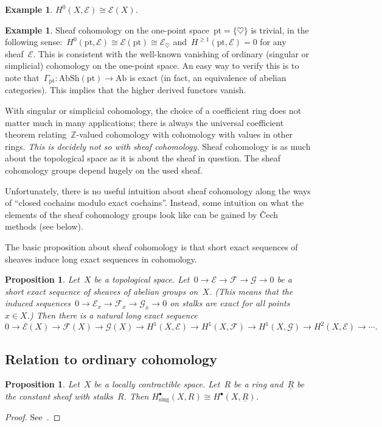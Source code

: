 \documentclass[10pt]{amsart}
\theoremstyle{definition}
\newtheorem{ex}[defn]{Example}
\theoremstyle{plain}
\newtheorem{prop}[defn]{Proposition}
\theoremstyle{remark}
\newcommand{\E}{\mathcal{E}}
\newcommand{\F}{\mathcal{F}}
\newcommand{\G}{\mathcal{G}}
\newcommand{\Z}{\mathbb{Z}}
\newcommand{\Ab}{\mathrm{Ab}}
\newcommand{\AbSh}{\mathrm{AbSh}}
\newcommand{\pt}{\mathrm{pt}}
\begin{document}
\begin{ex}$H^0(X,\E) \cong \E(X)$.\end{ex}

\begin{ex}Sheaf cohomology on the one-point space~$\pt = \{ \heartsuit \}$ is
trivial, in the following sense:~$H^0(\pt,\E) \cong \E(\pt) \cong \E_\heartsuit$
and~$H^{\geq 1}(\pt,\E) = 0$ for any sheaf~$\E$. This is consistent with the
well-known vanishing of ordinary (singular or simplicial) cohomology on the
one-point space. An easy way to verify this is to note that~$\Gamma_\pt :
\AbSh(\pt) \to \Ab$ is exact (in fact, an equivalence of abelian categories).
This implies that the higher derived functors vanish.\end{ex}

With singular or simplicial cohomology, the choice of a coefficient ring does
not matter much in many applications; there is always the universal coefficient
theorem relating~$\Z$-valued cohomology with cohomology with values in other
rings. \emph{This is decidely not so with sheaf cohomology.} Sheaf cohomology
is as much about the topological space as it is about the sheaf in question.
The sheaf cohomology groups depend hugely on the used sheaf.

Unfortunately, there is no useful intuition about sheaf cohomology along the
ways of ``closed cochains modulo exact cochains''. Instead, some intuition on
what the elements of the sheaf cohomology groups look like can be gained by
Čech methods (see below).

The basic proposition about sheaf cohomology is that short exact sequences of
sheaves induce long exact sequences in cohomology.

\begin{prop}Let~$X$ be a topological space. Let~$0 \to \E \to \F \to \G \to 0$
be a short exact sequence of sheaves of abelian groups on~$X$. (This means that
the induced sequences~$0 \to \E_x \to \F_x \to \G_x \to 0$ on stalks are exact
for all points~$x \in X$.) Then there is a natural long exact sequence
\[ 0 \to \E(X) \to \F(X) \to \G(X) \to
  H^1(X,\E) \to H^1(X,\F) \to H^1(X,\G) \to H^2(X,\E) \to \cdots. \]
\end{prop}


\subsection{Relation to ordinary cohomology}

\begin{prop}Let~$X$ be a locally contractible space. Let~$R$ be a ring
and~$\underline{R}$ be the constant sheaf with stalks~$R$. Then
$H^\bullet_\text{sing}(X, R) \cong H^\bullet(X, \underline{R})$.
\end{prop}
\begin{proof}See~\cite{cibotaru}.
\end{proof}
\end{document}
